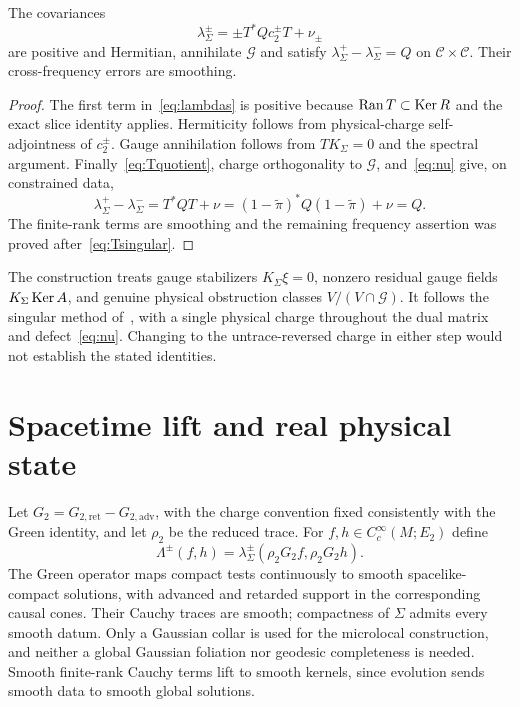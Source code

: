 \begin{proposition}\label{prop:covariances}
The covariances
\begin{equation}\label{eq:lambdas}
\lambda_\Sigma^\pm=\pm T^*Q c_2^\pm T+\nu_\pm
\end{equation}
are positive and Hermitian, annihilate $\mathcal G$ and satisfy
$\lambda_\Sigma^+-\lambda_\Sigma^-=Q$ on $\mathcal C\times\mathcal C$.
Their cross-frequency errors are smoothing.
\end{proposition}
\begin{proof}
The first term in~\eqref{eq:lambdas} is positive because $\operatorname{Ran} T\subset\operatorname{Ker} R$ and the exact slice identity applies.
Hermiticity follows from physical-charge self-adjointness of $c_2^\pm$.
Gauge annihilation follows from $TK_\Sigma=0$ and the spectral argument.
Finally~\eqref{eq:Tquotient}, charge orthogonality to $\mathcal G$, and~\eqref{eq:nu} give, on constrained data,
\[
\lambda_\Sigma^+-\lambda_\Sigma^-
=T^*QT+\nu
=(1-\widetilde\pi)^*Q(1-\widetilde\pi)+\nu=Q.
\]
The finite-rank terms are smoothing and the remaining frequency assertion was proved after~\eqref{eq:Tsingular}.
\end{proof}

The construction treats gauge stabilizers $K_\Sigma\xi=0$, nonzero residual gauge fields $K_\Sigma\operatorname{Ker} A$, and genuine physical obstruction classes $V/(V\cap\mathcal G)$.
It follows the singular method of~\cite[Theorem 5.2]{Gerard2024Compact}, with a single physical charge throughout the dual matrix and defect~\eqref{eq:nu}.
Changing to the untrace-reversed charge in either step would not establish the stated identities.

\section{Spacetime lift and real physical state}\label{sec:lift}
Let $G_2=G_{2,\mathrm{ret}}-G_{2,\mathrm{adv}}$, with the charge convention fixed consistently with the Green identity, and let $\rho_2$ be the reduced trace.
For $f,h\in C_c^\infty(M;E_2)$ define
\begin{equation}\label{eq:lift}
\Lambda^\pm(f,h)=\lambda_\Sigma^\pm(\rho_2G_2f,\rho_2G_2h).
\end{equation}
The Green operator maps compact tests continuously to smooth spacelike-compact solutions, with advanced and retarded support in the corresponding causal cones.
Their Cauchy traces are smooth; compactness of $\Sigma$ admits every smooth datum.
Only a Gaussian collar is used for the microlocal construction, and neither a global Gaussian foliation nor geodesic completeness is needed.
Smooth finite-rank Cauchy terms lift to smooth kernels, since evolution sends smooth data to smooth global solutions.

